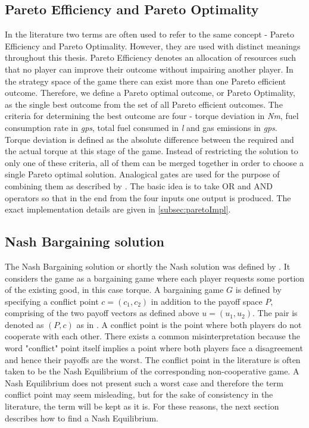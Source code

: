 {\subsection{Pareto Efficiency and Pareto Optimality}
\label{subsec:paretoFund}
In the literature two terms are often used to refer to the same concept - Pareto Efficiency and Pareto Optimality. However, they are used with distinct meanings throughout this thesis. Pareto Efficiency denotes an allocation of resources such that no player can improve their outcome without impairing another player. In the strategy space of the game there can exist more than one Pareto efficient outcome. Therefore, we define a Pareto optimal outcome, or Pareto Optimality, as the single best outcome from the set of all Pareto efficient outcomes. The criteria for determining the best outcome are four - torque deviation in \textit{Nm}, fuel consumption rate in \textit{gps}, total fuel consumed in \textit{l} and gas emissions in \textit{gps}. Torque deviation is defined as the absolute difference between the required and the actual torque at this stage of the game. Instead of restricting the solution to only one of these criteria, all of them can be merged together in order to choose a single Pareto optimal solution. Analogical gates are used for the purpose of combining them as described by \citet{badreddin1995analogical}. The basic idea is to take OR and AND operators so that in the end from the four inputs one output is produced. The exact implementation details are given in \ref{subsec:paretoImpl}.

\subsection{Nash Bargaining solution}
\label{subsec:nashbargFun}
The Nash Bargaining solution or shortly the Nash solution was defined by \citet{nash1950bargaining}. It considers the game as a bargaining game where each player requests some portion of the existing good, in this case torque. A bargaining game $G$ is defined by specifying a conflict point $c = (c_1,c_2)$ in addition to the payoff space $P$, comprising of the two payoff vectors as defined above $u = (u_1,u_2)$. The pair is denoted as $(P,c)$ as in \citet{holler2006einfuhrung}. A conflict point is the point where both players do not cooperate with each other. There exists a common misinterpretation because the word "conflict" point itself implies a point where both players face a disagreement and hence their payoffs are the worst. The conflict point in the literature is often taken to be the Nash Equilibrium of the corresponding non-cooperative game. A Nash Equilibrium does not present such a worst case and therefore the term conflict point may seem misleading, but for the sake of consistency in the literature, the term will be kept as it is. For these reasons, the next section describes how to find a Nash Equilibrium.

}
